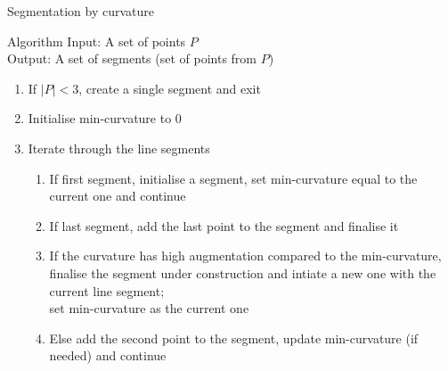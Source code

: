 \documentclass{beamer}
\begin{document}
\begin{frame}{Segmentation by curvature}
  \begin{block}{Algorithm}
    Input: A set of points $P$\\
    Output: A set of segments (set of points from $P$)
    \begin{enumerate}
      \item If $|P| < 3$, create a single segment and exit
      \item Initialise min-curvature to $0$
      \item Iterate through the line segments
        \begin{enumerate}
          \item If first segment, initialise a segment, set min-curvature equal to the current one and continue
          \item If last segment, add the last point to the segment and finalise it
          \item If the curvature has high augmentation compared to the min-curvature, finalise the segment under construction and intiate a new one with the current line segment;\\
          set min-curvature as the current one
          \item Else add the second point to the segment, update min-curvature (if needed) and continue
        \end{enumerate}
    \end{enumerate}
  \end{block}
\end{frame}
\end{document}
